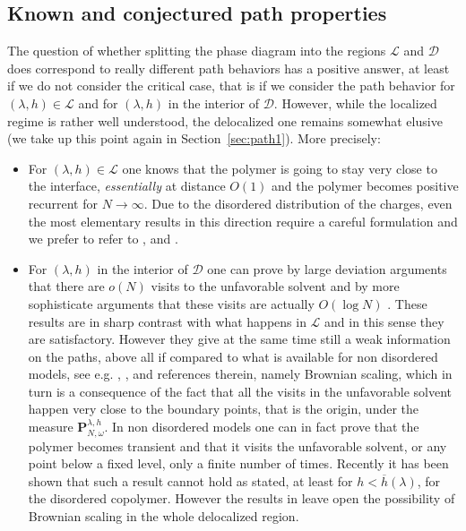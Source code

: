 \documentclass[reqno,11pt]{amsart}
\numberwithin{equation}{section}
\newcommand{\cL}{{\ensuremath{\mathcal L}} }
\newcommand{\cD}{{\ensuremath{\mathcal D}} }
\newcommand{\bP}{{\ensuremath{\mathbf P}} }
\newcommand{\go}{\omega}
\newcommand{\gl}{\lambda}
\begin{document}
\subsection{Known and conjectured  path properties}
\label{sec:pathwise}
The question of whether splitting the phase diagram
into the regions $\cL$ and $\cD$ does correspond
to really different path behaviors has a positive answer,
at least if we do not consider the critical case, that is
if we consider the path behavior for $(\gl, h) \in\cL$ and
for $(\gl, h)$ in the interior of $\cD$.
However, while the localized regime is rather well understood,
the delocalized one remains somewhat elusive (we take up this point again in Section~\ref{sec:path1}).
More precisely:
\smallskip
\begin{itemize}
\item For $(\gl, h) \in\cL$ one knows that the polymer is going to
stay very close to the interface, {\sl essentially} at distance $O(1)$ and the polymer
becomes positive recurrent for $N\to \infty$.
Due to the disordered distribution of the charges, even the most
elementary  results in this direction require a careful formulation and
we prefer to refer to \cite{cf:AZ}, \cite{cf:BisdH} and \cite{cf:Sinai}.
\item
For $(\gl, h)$ in the interior of $\cD$
one can prove by large deviation arguments that
there are $o(N)$ visits to the unfavorable solvent
and by more sophisticate arguments that these visits are actually $O(\log N)$
 \cite{cf:GT}. These results are
  in sharp contrast with what happens in $\cL$ and in this sense
they are satisfactory. However they give  at the same time still a  weak information on the paths,
above all if compared to what is available for non disordered models, see e.g.
\cite{cf:MGO}, \cite{cf:DGZ}, \cite{cf:CGZ} and references therein, namely Brownian scaling,
which in turn is a consequence of the fact that all the visits in the unfavorable
solvent happen very close to the boundary points, that is the origin, under the measure
$\bP _{N, \go}^{\gl,h}$. In non disordered models one can in fact prove that
the polymer becomes transient and that it visits the unfavorable solvent, or any point below a fixed
level,  only a finite
number of times. Recently it has been shown  \cite{cf:GT}
that such a result cannot hold as stated, at least for $h <\overline{h}(\gl)$, for the
disordered copolymer. However the results in  \cite{cf:GT}
leave open the possibility of Brownian scaling in the whole delocalized region.
\end{itemize}
 \smallskip
\end{document}
